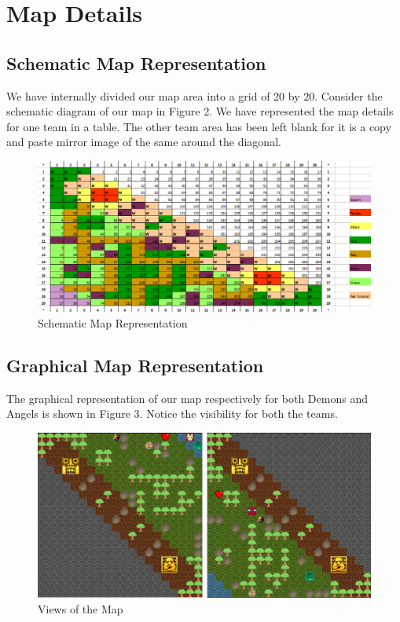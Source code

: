 \chapter{Map Details}

\section{Schematic Map Representation}
We have internally divided our map area into a grid of 20 by 20. Consider the schematic diagram of our map in Figure 2. We have represented the map details for one team in a table. The other team area has been left blank for it is a copy and paste mirror image of the same around the diagonal.

\begin{figure}[htp]
\centering
\includegraphics[width=1.1\textwidth]{Map_excel.png}
\caption{\label{fig:schematic}Schematic Map Representation}
\end{figure}


\section{Graphical Map Representation}
The graphical representation of our map respectively for both Demons and Angels is shown in Figure 3. Notice the visibility for both the teams. 

\begin{figure}[htp]
\centering
\includegraphics[width=1.0\textwidth]{Map_Views.png}
\caption{\label{fig:angels}Views of the Map}
\end{figure}


